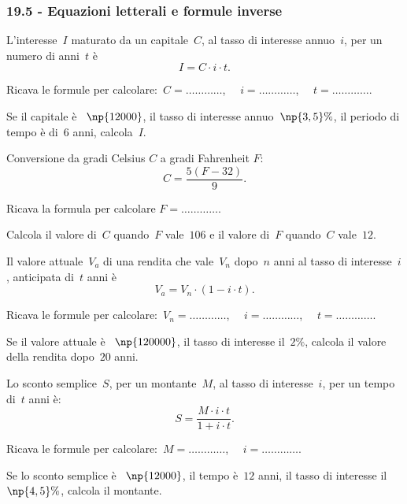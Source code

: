 \subsubsection*{19.5 - Equazioni letterali e formule inverse}

\begin{esercizio}
\label{ese:19.20}
L'interesse~$I$ maturato da un capitale~$C$, al tasso di interesse annuo~$i$, per un numero di anni~$t$ è
\begin{equation*}
  I=C\cdot i\cdot t.
\end{equation*}

Ricava le formule per calcolare:~$C=\ldots\ldots\ldots\ldots$, $\quad i=\ldots\ldots\ldots\ldots$, $\quad t =\ldots\ldots\ldots\ldots$.

Se il capitale è \officialeuro~$\np{12000}$, il tasso di interesse annuo~$\np{3,5}\%$, il periodo di tempo è di~$6$ anni, calcola~$I$.
\end{esercizio}

\begin{esercizio}
\label{ese:19.21}
Conversione da gradi Celsius $C$ a gradi Fahrenheit $F$:
\begin{equation*}
  C=\frac{5(F-32)}{9}.
\end{equation*}

Ricava la formula per calcolare $F=\ldots\ldots\ldots\ldots$.

Calcola il valore di~$C$ quando~$F$ vale~$106$ e il valore di~$F$ quando~$C$ vale~$12$.
\end{esercizio}

\begin{esercizio}
\label{ese:19.22}
Il valore attuale~$V_a$ di una rendita che vale~$V_n$ dopo~$n$ anni al tasso di interesse~$i$, anticipata di~$t$ anni è
\begin{equation*}
  V_{a}=V_{n}\cdot (1-i\cdot t).
\end{equation*}

Ricava le formule per calcolare:~$V_n=\ldots\ldots\ldots\ldots$, $\quad i=\ldots\ldots\ldots\ldots$, $\quad t =\ldots\ldots\ldots\ldots$.

Se il valore attuale è \officialeuro~$\np{120000}$, il tasso di interesse il~$2\%$, calcola il valore della rendita dopo~$20$ anni.
\end{esercizio}

\begin{esercizio}
\label{ese:19.23}
Lo sconto semplice~$S$, per un montante~$M$, al tasso di interesse~$i$, per un tempo di~$t$ anni è:
\begin{equation*}
  S=\frac{M\cdot i\cdot t}{1+i\cdot t}.
\end{equation*}

Ricava le formule per calcolare:~$M=\ldots\ldots\ldots\ldots$, $\quad i=\ldots\ldots\ldots\ldots$.

Se lo sconto semplice è \officialeuro~$\np{12000}$, il tempo è~$12$ anni, il tasso di interesse il~$\np{4,5}\%$, calcola il montante.
\end{esercizio}

